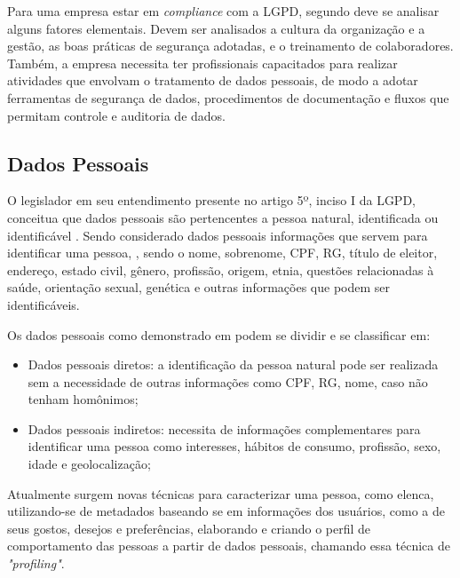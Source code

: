 \documentclass[
	12pt,				%
	openright,			%
	oneside,			%
	a4paper,			%
	english,			%
	french,				%
	spanish,			%
	brazil,				%
	]{abntex2}
\begin{document}
Para uma empresa estar em \textit{compliance} com a LGPD, segundo  deve se analisar alguns fatores elementais. Devem ser analisados a cultura da organização e a gestão, as boas práticas de segurança adotadas, e o treinamento de colaboradores. Também, a empresa necessita ter profissionais capacitados para realizar atividades que envolvam o tratamento de dados pessoais, de modo a adotar ferramentas de segurança de dados, procedimentos de documentação e fluxos que permitam controle e auditoria de dados. 

\subsection{Dados Pessoais}


O legislador em seu entendimento presente no artigo 5º, inciso I da LGPD, conceitua que dados pessoais são pertencentes a pessoa natural, identificada ou identificável \cite{01-01-LeiGeral}.  Sendo considerado dados pessoais informações que servem para identificar uma pessoa, \cite{Hoeren2020}, sendo o nome, sobrenome, CPF, RG, título de eleitor, endereço, estado civil, gênero, profissão, origem, etnia, questões relacionadas à saúde, orientação sexual, genética e outras informações que podem ser identificáveis.

Os dados pessoais como demonstrado em \cite{02-01-Vainzof2020} podem se dividir e se classificar em:
\begin{itemize}
\item Dados pessoais diretos: a identificação da pessoa natural pode ser realizada sem a necessidade de outras informações como CPF, RG, nome, caso não tenham homônimos;
\item Dados pessoais indiretos: necessita de informações complementares para identificar uma pessoa como interesses, hábitos de consumo, profissão, sexo, idade e geolocalização;
\end{itemize}

Atualmente surgem novas técnicas para caracterizar uma pessoa, como elenca,  utilizando-se de metadados baseando se em informações dos usuários, como a de seus gostos, desejos e preferências, elaborando e criando o perfil de comportamento das pessoas a partir de dados pessoais, chamando essa técnica de \textit{"profiling"}.
\end{document}
